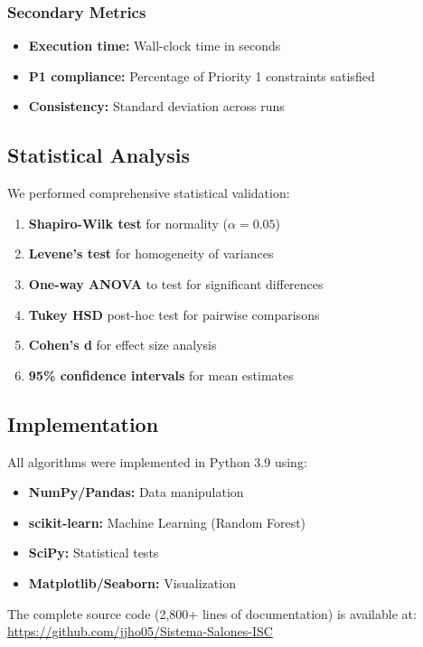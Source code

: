 \documentclass[algorithms,article,submit,pdftex,moreauthors]{Definitions/mdpi}
\begin{document}
\subsubsection{Secondary Metrics}

\begin{itemize}
\item \textbf{Execution time:} Wall-clock time in seconds
\item \textbf{P1 compliance:} Percentage of Priority 1 constraints satisfied
\item \textbf{Consistency:} Standard deviation across runs
\end{itemize}

\subsection{Statistical Analysis}

We performed comprehensive statistical validation:

\begin{enumerate}
\item \textbf{Shapiro-Wilk test} for normality ($\alpha = 0.05$)
\item \textbf{Levene's test} for homogeneity of variances
\item \textbf{One-way ANOVA} to test for significant differences
\item \textbf{Tukey HSD} post-hoc test for pairwise comparisons
\item \textbf{Cohen's d} for effect size analysis
\item \textbf{95\% confidence intervals} for mean estimates
\end{enumerate}

\subsection{Implementation}

All algorithms were implemented in Python 3.9 using:
\begin{itemize}
\item \textbf{NumPy/Pandas:} Data manipulation
\item \textbf{scikit-learn:} Machine Learning (Random Forest)
\item \textbf{SciPy:} Statistical tests
\item \textbf{Matplotlib/Seaborn:} Visualization
\end{itemize}

The complete source code (2,800+ lines of documentation) is available at: \url{https://github.com/jjho05/Sistema-Salones-ISC}
\end{document}

